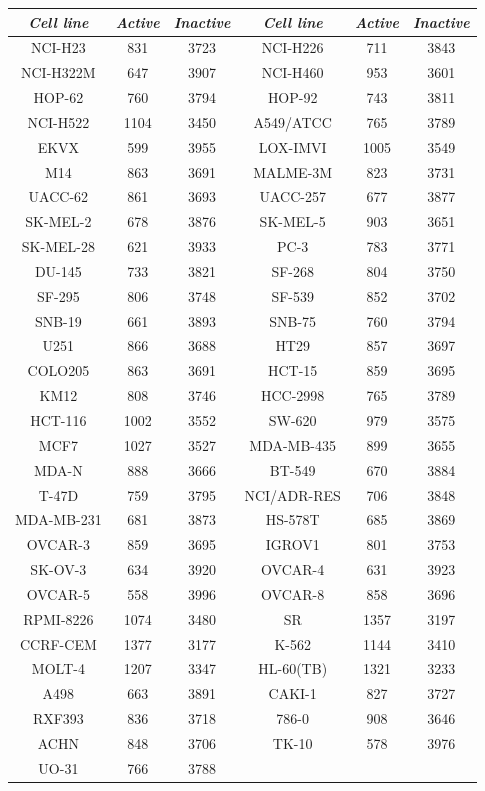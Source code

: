 \documentclass[english]{tktltiki}
\begin{document}
\begin{center}
\begin{table}
\centering
\begin{tabular}{|c|c|c||c|c|c|}\hline
\textbf{\em Cell line}	&\textbf{\em Active}	&\textbf{\em Inactive}	&\textbf{\em Cell line}	&\textbf{\em Active}	&\textbf{\em Inactive}	\\ \hline \hline

NCI-H23& 831& 3723 &NCI-H226& 711& 3843 \\ \hline
NCI-H322M& 647& 3907 &NCI-H460& 953& 3601 \\ \hline
HOP-62& 760& 3794 &HOP-92& 743& 3811 \\ \hline
NCI-H522& 1104& 3450 &A549/ATCC& 765& 3789 \\ \hline
EKVX& 599& 3955 &LOX-IMVI& 1005& 3549 \\ \hline
M14& 863& 3691 &MALME-3M& 823& 3731 \\ \hline
UACC-62& 861& 3693 &UACC-257& 677& 3877 \\ \hline
SK-MEL-2& 678& 3876 &SK-MEL-5& 903& 3651 \\ \hline
SK-MEL-28& 621& 3933 &PC-3& 783& 3771 \\ \hline
DU-145& 733& 3821 &SF-268& 804& 3750 \\ \hline
SF-295& 806& 3748 &SF-539& 852& 3702 \\ \hline
SNB-19& 661& 3893 &SNB-75& 760& 3794 \\ \hline
U251& 866& 3688 &HT29& 857& 3697 \\ \hline
COLO205& 863& 3691 &HCT-15& 859& 3695 \\ \hline
KM12& 808& 3746 &HCC-2998& 765& 3789 \\ \hline
HCT-116& 1002& 3552 &SW-620& 979& 3575 \\ \hline
MCF7& 1027& 3527 &MDA-MB-435& 899& 3655 \\ \hline
MDA-N& 888& 3666 &BT-549& 670& 3884 \\ \hline
T-47D& 759& 3795 &NCI/ADR-RES& 706& 3848 \\ \hline
MDA-MB-231& 681& 3873 &HS-578T& 685& 3869 \\ \hline
OVCAR-3& 859& 3695 &IGROV1& 801& 3753 \\ \hline
SK-OV-3& 634& 3920 &OVCAR-4& 631& 3923 \\ \hline
OVCAR-5& 558& 3996 &OVCAR-8& 858& 3696 \\ \hline
RPMI-8226& 1074& 3480 &SR& 1357& 3197 \\ \hline
CCRF-CEM& 1377& 3177 &K-562& 1144& 3410 \\ \hline
MOLT-4& 1207& 3347 &HL-60(TB)& 1321& 3233 \\ \hline
A498& 663& 3891 &CAKI-1& 827& 3727 \\ \hline
RXF393& 836& 3718 &786-0& 908& 3646 \\ \hline
ACHN& 848& 3706 &TK-10& 578& 3976 \\ \hline
UO-31& 766& 3788 && & \\ \hline


\end{tabular}
\end{table}
\end{center}
\end{document}
